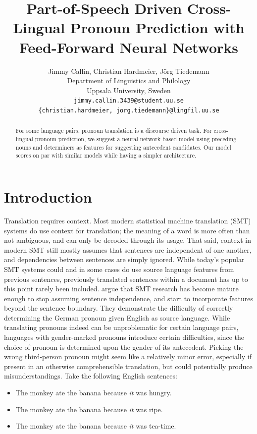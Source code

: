 \documentclass[11pt]{article}
\title{Part-of-Speech Driven Cross-Lingual Pronoun Prediction with Feed-Forward Neural Networks}
\author{Jimmy Callin, Christian Hardmeier, Jörg Tiedemann \\
  Department of Linguistics and Philology \\
  Uppsala University, Sweden \\
  {\tt jimmy.callin.3439@student.uu.se} \\ {\tt \{christian.hardmeier, jorg.tiedemann\}@lingfil.uu.se}}
\date{}
\begin{document}
\maketitle
\begin{abstract}
    For some language pairs, pronoun translation is a discourse driven task. For cross-lingual pronoun prediction, we suggest a neural network based model using preceding nouns and determiners as features for suggesting antecedent candidates. Our model scores on par with similar models while having a simpler architecture.
\end{abstract}


\section{Introduction}

Translation requires context.
Most modern statistical machine translation (SMT) systems do use context for translation; the meaning of a word is more often than not ambiguous, and can only be decoded through its usage.
That said, context in modern SMT still mostly assumes that sentences are independent of one another, and dependencies between sentences are simply ignored.
While today's popular SMT systems could and in some cases do use source language features from previous sentences, previously translated sentences within a document has up to this point rarely been included.
\textcite{Hardmeier2010Modelling} argue that SMT research has become mature enough to stop assuming sentence independence, and start to incorporate features beyond the sentence boundary.
They demonstrate the difficulty of correctly determining the German pronoun given English as source language.
While translating pronouns indeed can be unproblematic for certain language pairs, languages with gender-marked pronouns introduce certain difficulties, since the choice of pronoun is determined upon the gender of its antecedent.
Picking the wrong third-person pronoun might seem like a relatively minor error, especially if present in an otherwise comprehensible translation, but could potentially produce misunderstandings. Take the following English sentences:

\begin{itemize}
    \setlength{\itemsep}{-0.2em}
    \item The monkey ate the banana because \emph{it} was hungry.
    \item The monkey ate the banana because \emph{it} was ripe.
    \item The monkey ate the banana because \emph{it} was tea-time.
\end{itemize}
\end{document}
